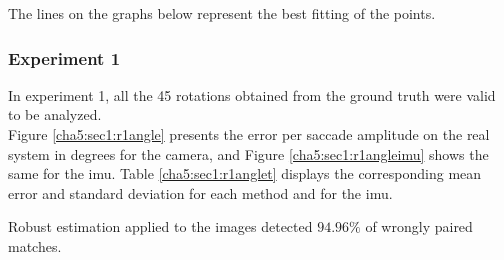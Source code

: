 The lines on the graphs below represent the best fitting of the points.
\subsubsection{Experiment 1}
In experiment 1, all the 45 rotations obtained from the ground truth were valid to be analyzed.\\
Figure \ref{cha5:sec1:r1angle} presents the error per saccade amplitude on the real system in degrees for the camera, and Figure \ref{cha5:sec1:r1angleimu} shows the same for the \acrshort{imu}. Table \ref{cha5:sec1:r1anglet} displays the corresponding mean error and standard deviation for each method and for the \acrshort{imu}.

Robust estimation applied to the images detected $ 94.96 \%$ of wrongly paired matches. \\

